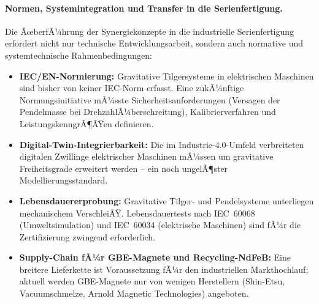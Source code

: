 ﻿\documentclass[12pt, a4paper]{report}
\theoremstyle{definition}
\theoremstyle{remark}
\begin{document}
\paragraph{Normen, Systemintegration und Transfer in die Serienfertigung.}
Die ÃœberfÃ¼hrung der Synergiekonzepte in die industrielle Serienfertigung erfordert
nicht nur technische Entwicklungsarbeit, sondern auch normative und systemtechnische
Rahmenbedingungen:
\begin{itemize}
  \item \textbf{IEC/EN-Normierung:} Gravitative Tilgersysteme in elektrischen
        Maschinen sind bisher von keiner IEC-Norm erfasst. Eine zukÃ¼nftige
        Normungsinitiative mÃ¼sste Sicherheitsanforderungen (Versagen der
        Pendelmasse bei DrehzahlÃ¼berschreitung), Kalibrierverfahren und
        LeistungskenngrÃ¶ÃŸen definieren.
  \item \textbf{Digital-Twin-Integrierbarkeit:} Die im Industrie-4.0-Umfeld
        verbreiteten digitalen Zwillinge elektrischer Maschinen mÃ¼ssen um
        gravitative Freiheitsgrade erweitert werden -- ein noch ungelÃ¶ster
        Modellierungsstandard.
  \item \textbf{Lebensdauererprobung:} Gravitative Tilger- und Pendelsysteme
        unterliegen mechanischem VerschleiÃŸ. Lebens\-dauertests nach
        IEC~60068 (Umweltsimulation) und IEC~60034 (elektrische Maschinen) sind
        fÃ¼r die Zertifizierung zwingend erforderlich.
  \item \textbf{Supply-Chain fÃ¼r GBE-Magnete und Recycling-NdFeB:}
        Eine breitere Lieferkette ist Voraussetzung fÃ¼r den industriellen
        Markthochlauf; aktuell werden GBE-Magnete nur von wenigen Herstellern
        (Shin-Etsu, Vacuumschmelze, Arnold Magnetic Technologies) angeboten.
\end{itemize}
\end{document}
